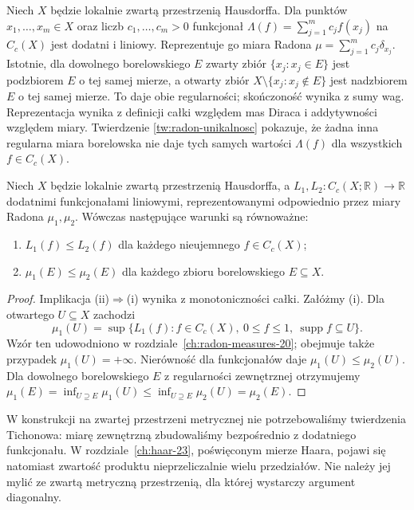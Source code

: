 \begin{przyklad}
Niech $X$ będzie lokalnie zwartą przestrzenią Hausdorffa. Dla punktów $x_1,\dots,x_m\in X$ oraz liczb $c_1,\dots,c_m>0$ funkcjonał $\Lambda(f)=\sum_{j=1}^m c_jf(x_j)$ na $C_c(X)$ jest dodatni i liniowy. Reprezentuje go miara Radona $\mu=\sum_{j=1}^m c_j\delta_{x_j}$. Istotnie, dla dowolnego borelowskiego $E$ zwarty zbiór $\{x_j:x_j\in E\}$ jest podzbiorem $E$ o tej samej mierze, a otwarty zbiór $X\setminus\{x_j:x_j\notin E\}$ jest nadzbiorem $E$ o tej samej mierze. To daje obie regularności; skończoność wynika z sumy wag. Reprezentacja wynika z definicji całki względem mas Diraca i addytywności względem miary. Twierdzenie \ref{tw:radon-unikalnosc} pokazuje, że żadna inna regularna miara borelowska nie daje tych samych wartości $\Lambda(f)$ dla wszystkich $f\in C_c(X)$.
\end{przyklad}

\begin{wniosek}
\label{cor:riesz-order-21}
Niech $X$ będzie lokalnie zwartą przestrzenią
Hausdorffa, a $L_1,L_2:C_c(X;\mathbb R)\to\mathbb R$
dodatnimi funkcjonałami liniowymi, reprezentowanymi
odpowiednio przez miary Radona $\mu_1,\mu_2$.
Wówczas następujące warunki są równoważne:
\begin{enumerate}[label=(\roman*)]
\item $L_1(f)\le L_2(f)$ dla każdego nieujemnego $f\in C_c(X)$;
\item $\mu_1(E)\le\mu_2(E)$ dla każdego zbioru borelowskiego
$E\subseteq X$.
\end{enumerate}
\end{wniosek}
\begin{proof}
Implikacja (ii)$\Rightarrow$(i) wynika z monotoniczności całki.
Załóżmy (i). Dla otwartego $U\subseteq X$ zachodzi
\[
 \mu_1(U)=\sup\{L_1(f):f\in C_c(X),\ 0\le f\le1,
 \ \operatorname{supp}f\subseteq U\}.
\]
Wzór ten udowodniono w rozdziale~\ref{ch:radon-measures-20};
obejmuje także przypadek $\mu_1(U)=+\infty$.
Nierówność dla funkcjonałów daje
$\mu_1(U)\le\mu_2(U)$. Dla dowolnego borelowskiego
$E$ z regularności zewnętrznej otrzymujemy
$\mu_1(E)=\inf_{U\supseteq E}\mu_1(U)
\le\inf_{U\supseteq E}\mu_2(U)=\mu_2(E)$.
\end{proof}

\begin{uwaga}
W konstrukcji na zwartej przestrzeni metrycznej nie
potrzebowaliśmy twierdzenia Tichonowa: miarę zewnętrzną
zbudowaliśmy bezpośrednio z dodatniego funkcjonału.
W rozdziale~\ref{ch:haar-23}, poświęconym mierze Haara,
pojawi się natomiast zwartość produktu nieprzeliczalnie
wielu przedziałów.
Nie należy jej mylić ze zwartą metryczną przestrzenią,
dla której wystarczy argument diagonalny.
\end{uwaga}

